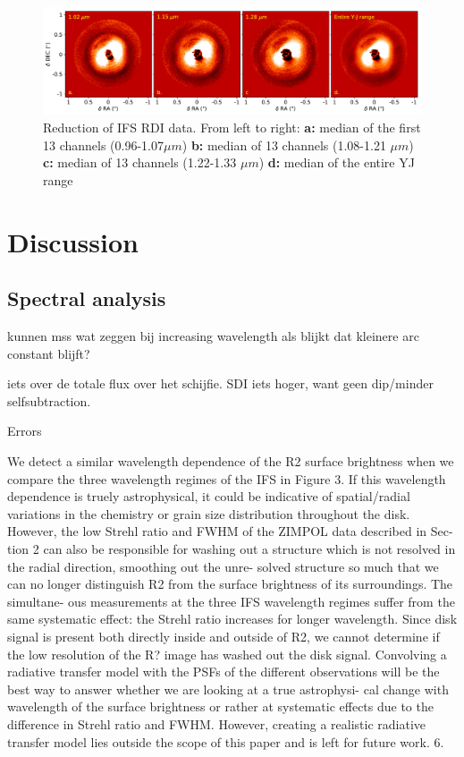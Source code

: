 \documentclass[twoside,single]{lion-msc}
\begin{document}
\begin{figure}[htb]
\centering
\includegraphics[trim={0cm 0cm 0cm 0cm},clip,width = \textwidth]{RDIwavelplot}
\caption{Reduction of IFS RDI data. From left to right: \textbf{a:} median of the first 13 channels (0.96-1.07$\mu m$) \textbf{b:} median of 13 channels (1.08-1.21 $\mu m$) \textbf{c:} median of 13 channels (1.22-1.33 $\mu m$) \textbf{d:} median of the entire YJ range}
\label{fig:ADIcolor}
\end{figure}



\chapter{Discussion}
\section{Spectral analysis}
kunnen mss wat zeggen bij increasing wavelength als blijkt dat kleinere arc constant blijft?

iets over de totale flux over het schijfie. SDI iets hoger, want geen dip/minder selfsubtraction.

Errors


We detect a similar wavelength dependence of the R2 surface brightness when we compare the three wavelength regimes of the IFS in Figure 3. If this wavelength dependence is truely astrophysical, it could be indicative of spatial/radial variations in the chemistry or grain size distribution throughout the disk. However, the low Strehl ratio and FWHM of the ZIMPOL data described in Sec- tion 2 can also be responsible for washing out a structure which is not resolved in the radial direction, smoothing out the unre- solved structure so much that we can no longer distinguish R2 from the surface brightness of its surroundings. The simultane- ous measurements at the three IFS wavelength regimes suffer from the same systematic effect: the Strehl ratio increases for longer wavelength. Since disk signal is present both directly inside and outside
of R2, we cannot determine if the low resolution of the R? image has washed out the disk signal. Convolving a radiative transfer model with the PSFs of the different observations will be the best way to answer whether we are looking at a true astrophysi- cal change with wavelength of the surface brightness or rather at systematic effects due to the difference in Strehl ratio and FWHM. However, creating a realistic radiative transfer model lies outside the scope of this paper and is left for future work.
6.
\end{document}
